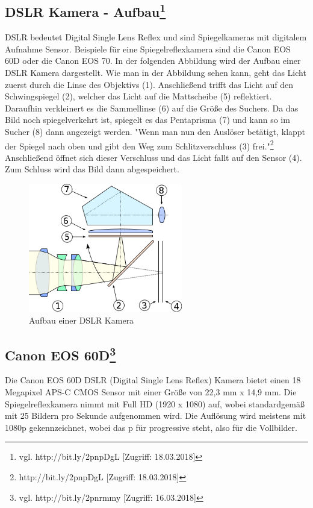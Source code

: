 \subsection[DSLR Kamera - Aufbau]{DSLR Kamera - Aufbau\protect\footnote{\label{}vgl. http://bit.ly/2pnpDgL [Zugriff: 18.03.2018]}}
DSLR bedeutet Digital Single Lens Reflex und sind Spiegelkameras mit digitalem Aufnahme Sensor. Beispiele für eine Spiegelreflexkamera sind die Canon EOS 60D oder die Canon EOS 70. In der folgenden Abbildung wird der Aufbau einer DSLR Kamera dargestellt. Wie man in der Abbildung sehen kann, geht das Licht zuerst durch die Linse des Objektivs (1). Anschließend trifft das Licht auf den Schwingspiegel (2), welcher das Licht auf die Mattscheibe (5) reflektiert. Daraufhin verkleinert es die Sammellinse (6) auf die Größe des Suchers. Da das Bild noch spiegelverkehrt ist, spiegelt es das Pentaprisma (7) und kann so im Sucher (8) dann angezeigt werden. "Wenn man nun den Auslöser betätigt, klappt der Spiegel nach oben und gibt den Weg zum Schlitzverschluss (3) frei."\footnote{\label{}http://bit.ly/2pnpDgL [Zugriff: 18.03.2018]} Anschließend öffnet sich dieser Verschluss und das Licht fallt auf den Sensor (4). Zum Schluss wird das Bild dann abgespeichert.
\begin{figure}[H]
	\centering
	\includegraphics[width=0.6\textwidth]{abb13} 
	\caption{Aufbau einer DSLR Kamera}
\end{figure}
\subsection[Canon EOS 60D]{Canon EOS 60D\protect\footnote{\label{}vgl. http://bit.ly/2pnrmmy [Zugriff: 16.03.2018]}} Die Canon EOS 60D DSLR (Digital Single Lens Reflex) Kamera bietet einen 18 Megapixel APS-C CMOS Sensor mit einer Größe von 22,3 mm x 14,9 mm. Die Spiegelreflexkamera nimmt mit Full HD (1920 x 1080) auf, wobei standardgemäß mit 25 Bildern pro Sekunde aufgenommen wird. Die Auflösung wird meistens mit 1080p gekennzeichnet, wobei das p für progressive steht, also für die Vollbilder.
